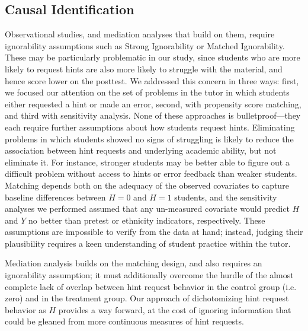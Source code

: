 \documentclass{article}\usepackage[]{graphicx}\usepackage[]{color}
\begin{document}
\subsection{Causal Identification}

Observational studies, and mediation analyses that build on them,
require ignorability assumptions such as Strong Ignorability or
Matched Ignorability.
These may be particularly problematic in our study, since students who
are more likely to request hints are also more likely to struggle with
the material, and hence score lower on the posttest.
We addressed this concern in three ways: first, we focused our attention
on the set of problems in the tutor in which students either requested
a hint or made an error, second, with propensity score matching, and
third with sensitivity analysis.
None of these approaches is bulletproof---they each require further
assumptions about how students request hints.
Eliminating problems in which students showed no signs of struggling
is likely to reduce the association between hint requests and
underlying academic ability, but not eliminate it.
For instance, stronger students may be better able to figure out a
difficult problem without access to hints or error feedback than
weaker students.
Matching depends both on the adequacy of the observed covariates to
capture baseline differences between $H=0$ and $H=1$ students, and the
sensitivity analyses we performed assumed that any un-measured
covariate would predict $H$ and $Y$ no better than pretest or ethnicity indicators, respectively.
These assumptions are impossible to verify from the data at hand;
instead, judging their plausibility requires a keen understanding of student practice within
the tutor.

Mediation analysis builds on the matching design, and also requires an
ignorability assumption; it must
additionally overcome the hurdle of the almost complete lack of
overlap between hint request behavior in the control group (i.e. zero)
and in the treatment group.
Our approach of dichotomizing hint request behavior as $H$ provides a
way forward, at the cost of ignoring information that could be gleaned
from more continuous measures of hint requests.
\end{document}
